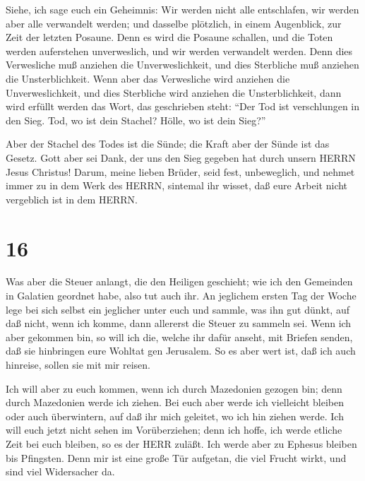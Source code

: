  Siehe, ich sage euch ein Geheimnis: Wir werden nicht alle
entschlafen, wir werden aber alle verwandelt werden;  und
dasselbe plötzlich, in einem Augenblick, zur Zeit der letzten Posaune.
Denn es wird die Posaune schallen, und die Toten werden auferstehen
unverweslich, und wir werden verwandelt werden.  Denn dies
Verwesliche muß anziehen die Unverweslichkeit, und dies Sterbliche muß
anziehen die Unsterblichkeit.  Wenn aber das Verwesliche
wird anziehen die Unverweslichkeit, und dies Sterbliche wird anziehen
die Unsterblichkeit, dann wird erfüllt werden das Wort, das geschrieben
steht:  ``Der Tod ist verschlungen in den Sieg. Tod, wo ist
dein Stachel? Hölle, wo ist dein Sieg?''

 Aber der Stachel des Todes ist die Sünde; die Kraft aber
der Sünde ist das Gesetz.  Gott aber sei Dank, der uns den
Sieg gegeben hat durch unsern HERRN Jesus Christus!  Darum,
meine lieben Brüder, seid fest, unbeweglich, und nehmet immer zu in dem
Werk des HERRN, sintemal ihr wisset, daß eure Arbeit nicht vergeblich
ist in dem HERRN.

\hypertarget{section-15}{%
\section{16}\label{section-15}}

 Was aber die Steuer anlangt, die den Heiligen geschieht;
wie ich den Gemeinden in Galatien geordnet habe, also tut auch ihr.
 An jeglichem ersten Tag der Woche lege bei sich selbst ein
jeglicher unter euch und sammle, was ihn gut dünkt, auf daß nicht, wenn
ich komme, dann allererst die Steuer zu sammeln sei.  Wenn
ich aber gekommen bin, so will ich die, welche ihr dafür anseht, mit
Briefen senden, daß sie hinbringen eure Wohltat gen Jerusalem.
 So es aber wert ist, daß ich auch hinreise, sollen sie mit
mir reisen.

 Ich will aber zu euch kommen, wenn ich durch Mazedonien
gezogen bin; denn durch Mazedonien werde ich ziehen.  Bei
euch aber werde ich vielleicht bleiben oder auch überwintern, auf daß
ihr mich geleitet, wo ich hin ziehen werde.  Ich will euch
jetzt nicht sehen im Vorüberziehen; denn ich hoffe, ich werde etliche
Zeit bei euch bleiben, so es der HERR zuläßt.  Ich werde
aber zu Ephesus bleiben bis Pfingsten.  Denn mir ist eine
große Tür aufgetan, die viel Frucht wirkt, und sind viel Widersacher da.

